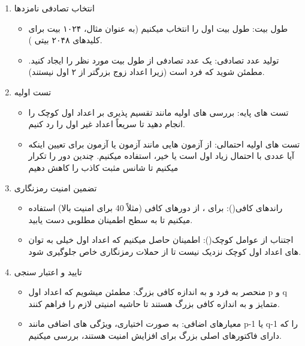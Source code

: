 \documentclass{report}
\begin{document}
\begin{enumerate}
    \item
    انتخاب تصادفی نامزدها
    \begin{itemize}
        \item 
        طول بیت: طول بیت اول را انتخاب میکنیم (به عنوان مثال، ۱۰۲۴ بیت برای کلیدهای ۲۰۴۸ بیتی ).
        
        \item 
        تولید عدد تصادفی: یک عدد تصادفی از طول بیت مورد نظر را ایجاد کنید. مطمئن شوید که فرد است (زیرا اعداد زوج بزرگتر از ۲ اول نیستند).
    \end{itemize}
    
    \item
    تست اولیه
    \begin{itemize}
        \item 
        تست های پایه: بررسی های اولیه مانند تقسیم پذیری بر اعداد اول کوچک را انجام دهید تا سریعاً اعداد غیر اول را رد کنیم.
        \item 
        تست های اولیه احتمالی: از آزمون هایی مانند آزمون  یا آزمون  برای تعیین اینکه آیا عددی با احتمال زیاد اول است یا خیر، استفاده میکنیم. چندین دور را تکرار میکنیم تا شانس مثبت کاذب را کاهش دهیم
    \end{itemize}
    
    \item 
    تضمین امنیت رمزنگاری
    \begin{itemize}
        \item 
        راندهای کافی(): برای ، از دورهای کافی (مثلاً 40 برای امنیت بالا) استفاده میکنیم تا به سطح اطمینان مطلوبی دست یابید.
        \item 
        اجتناب از عوامل کوچک(): اطمینان حاصل میکنیم که اعداد اول خیلی به توان های اعداد اول کوچک نزدیک نیست تا از حملات رمزنگاری خاص جلوگیری شود.
    \end{itemize}

    \item 
    تایید و اعتبار سنجی
    \begin{itemize}
        \item
        منحصر به فرد و به اندازه کافی بزرگ: مطمئن میشویم که اعداد اول p و q متمایز و به اندازه کافی بزرگ هستند تا حاشیه امنیتی لازم را فراهم کنند.

        \item
        معیارهای اضافی: به صورت اختیاری، ویژگی های اضافی مانند p-1 یا q-1 را که دارای فاکتورهای اصلی بزرگ برای افزایش امنیت هستند، بررسی میکنیم.
    \end{itemize}
\end{enumerate}
\end{document}
